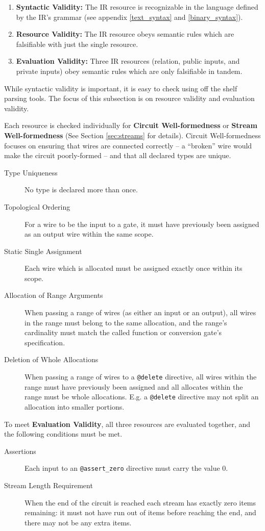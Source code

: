 \begin{enumerate}
  \item \textbf{Syntactic Validity:} The IR resource is recognizable in the language defined by the IR's grammar (see appendix \ref{text_syntax} and \ref{binary_syntax}).
  \item \textbf{Resource Validity:} The IR resource obeys semantic rules which are falsifiable with just the single resource.
  \item \textbf{Evaluation Validity:} Three IR resources (relation, public inputs, and private inputs) obey semantic rules which are only falsifiable in tandem.
\end{enumerate}

While syntactic validity is important, it is easy to check using off the shelf parsing tools.
The focus of this subsection is on resource validity and evaluation validity.

Each resource is checked individually for \textbf{Circuit Well-formedness} or \textbf{Stream Well-formedness} (See Section \ref{sec:streams} for details).
Circuit Well-formedness focuses on ensuring that wires are connected correctly -- a ``broken'' wire would make the circuit poorly-formed -- and that all declared types are unique.

\begin{description}
  \item[Type Uniqueness] No type is declared more than once.
  \item[Topological Ordering] For a wire to be the input to a gate, it must have previously been assigned as an output wire within the same scope.
  \item[Static Single Assignment] Each wire which is allocated must be assigned exactly once within its scope.
  \item[Allocation of Range Arguments] When passing a range of wires (as either an input or an output), all wires in the range must belong to the same allocation, and the range's cardinality must match the called function or conversion gate's specification.
  \item[Deletion of Whole Allocations] When passing a range of wires to a \texttt{@delete} directive, all wires within the range must have previously been assigned and all allocates within the range must be whole allocations. E.g. a \texttt{@delete} directive may not split an allocation into smaller portions.
\end{description}

To meet \textbf{Evaluation Validity}, all three resources are evaluated together, and the following conditions must be met.

\begin{description}
  \item[Assertions] Each input to an \texttt{@assert\_zero} directive must carry the value $0$.
  \item[Stream Length Requirement] When the end of the circuit is reached each stream has exactly zero items remaining: it must not have run out of items before reaching the end, and there may not be any extra items.
\end{description}
